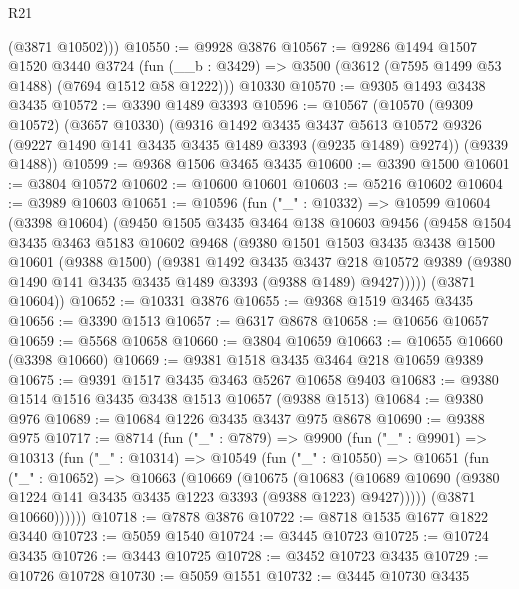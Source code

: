 \begin{lexlean}{R21}
\begin{coremodule}
        (@3871 @10502)))
@10550 := @9928 @3876
@10567 := @9286
    @1494
    @1507
    @1520
    @3440
    @3724
    (fun (__b : @3429) => @3500 (@3612 (@7595 @1499 @53 @1488) (@7694 @1512 @58 @1222)))
    @10330
@10570 := @9305 @1493 @3438 @3435
@10572 := @3390 @1489 @3393
@10596 := @10567
    (@10570
      (@9309 @10572)
      (@3657 @10330)
      (@9316
        @1492
        @3435
        @3437
        @5613
        @10572
        @9326
        (@9227 @1490 @141 @3435 @3435 @1489 @3393 (@9235 @1489) @9274))
      (@9339 @1488))
@10599 := @9368 @1506 @3465 @3435
@10600 := @3390 @1500
@10601 := @3804 @10572
@10602 := @10600 @10601
@10603 := @5216 @10602
@10604 := @3989 @10603
@10651 := @10596
    (fun ("_" : @10332) =>
    @10599
      @10604
      (@3398 @10604)
      (@9450
        @1505
        @3435
        @3464
        @138
        @10603
        @9456
        (@9458
          @1504
          @3435
          @3463
          @5183
          @10602
          @9468
          (@9380
            @1501
            @1503
            @3435
            @3438
            @1500
            @10601
            (@9388 @1500)
            (@9381
              @1492
              @3435
              @3437
              @218
              @10572
              @9389
              (@9380 @1490 @141 @3435 @3435 @1489 @3393 (@9388 @1489) @9427)))))
      (@3871 @10604))
@10652 := @10331 @3876
@10655 := @9368 @1519 @3465 @3435
@10656 := @3390 @1513
@10657 := @6317 @8678
@10658 := @10656 @10657
@10659 := @5568 @10658
@10660 := @3804 @10659
@10663 := @10655 @10660 (@3398 @10660)
@10669 := @9381 @1518 @3435 @3464 @218 @10659 @9389
@10675 := @9391 @1517 @3435 @3463 @5267 @10658 @9403
@10683 := @9380 @1514 @1516 @3435 @3438 @1513 @10657 (@9388 @1513)
@10684 := @9380 @976
@10689 := @10684 @1226 @3435 @3437 @975 @8678
@10690 := @9388 @975
@10717 := @8714
    (fun ("_" : @7879) =>
    @9900
      (fun ("_" : @9901) =>
      @10313
        (fun ("_" : @10314) =>
        @10549
          (fun ("_" : @10550) =>
          @10651
            (fun ("_" : @10652) =>
            @10663
              (@10669
                (@10675
                  (@10683
                    (@10689
                      @10690
                      (@9380 @1224 @141 @3435 @3435 @1223 @3393 (@9388 @1223) @9427)))))
              (@3871 @10660))))))
@10718 := @7878 @3876
@10722 := @8718 @1535 @1677 @1822 @3440
@10723 := @5059 @1540
@10724 := @3445 @10723
@10725 := @10724 @3435
@10726 := @3443 @10725
@10728 := @3452 @10723 @3435
@10729 := @10726 @10728
@10730 := @5059 @1551
@10732 := @3445 @10730 @3435

\end{coremodule}
\end{lexlean}
